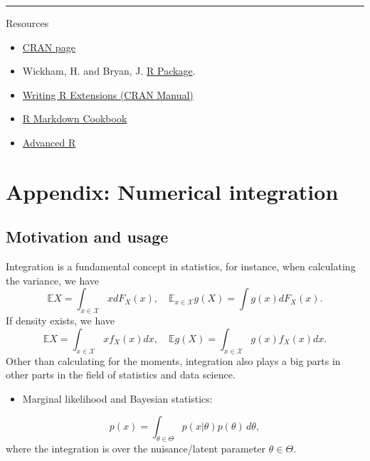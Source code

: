\documentclass[
  letterpaper,
  DIV=11,
  numbers=noendperiod]{scrreprt}
\providecommand{\tightlist}{%
  \setlength{\itemsep}{0pt}\setlength{\parskip}{0pt}}
\begin{document}
\begin{center}\rule{0.5\linewidth}{0.5pt}\end{center}

Resources

\begin{itemize}
\item
  \href{https://cran.r-project.org/web/packages/distributions/index.html}{CRAN
  page}
\item
  Wickham, H. and Bryan, J. \href{https://r-pkgs.org/}{R Package}.
\item
  \href{https://cran.r-project.org/doc/manuals/r-release/R-exts.html}{Writing
  R Extensions (CRAN Manual)}
\item
  \href{https://bookdown.org/yihui/rmarkdown/}{R Markdown Cookbook}
\item
  \href{https://adv-r.hadley.nz/}{Advanced R}
\end{itemize}

\chapter{Appendix: Numerical
integration}\label{appendix-numerical-integration}

\newcommand{\E}{\mathbb E}
\newcommand{\X}{\mathcal X}

\section{Motivation and usage}\label{motivation-and-usage}

Integration is a fundamental concept in statistics, for instance, when
calculating the variance, we have \[
  \mathbb EX = \int_{x\in\mathcal X} x dF_X(x),\quad \mathbb E_{x\in\mathcal X} g(X) = \int g(x) dF_X(x).
\] If density exists, we have \[
\mathbb EX = \int_{x\in\mathcal X} x f_X(x) dx,\quad \mathbb Eg(X) = \int_{x\in\mathcal X} g(x) f_X(x) dx.
\] Other than calculating for the moments, integration also plays a big
parts in other parts in the field of statistics and data science.

\begin{itemize}
\tightlist
\item
  Marginal likelihood and Bayesian statistics:
\end{itemize}

\[
  p(x) = \int_{\theta\in\Theta}     p(x|\theta)p(\theta)\,d\theta,
\] where the integration is over the nuisance/latent parameter
\(\theta\in\Theta\).
\end{document}
